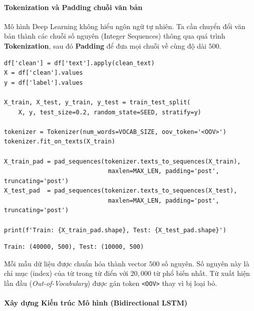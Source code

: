 \paragraph{Tokenization và Padding chuỗi văn bản} \hfill\mbox{}

Mô hình Deep Learning không hiểu ngôn ngữ tự nhiên. Ta cần chuyển đổi văn bản thành các chuỗi số nguyên (Integer Sequences) thông qua quá trình \textbf{Tokenization}, sau đó \textbf{Padding} để đưa mọi chuỗi về cùng độ dài $500$.

\begin{lstlisting}[style=pythoncode, caption={Tokenize và Padding chuẩn hóa độ dài chuỗi}]
df['clean'] = df['text'].apply(clean_text)
X = df['clean'].values
y = df['label'].values

X_train, X_test, y_train, y_test = train_test_split(
    X, y, test_size=0.2, random_state=SEED, stratify=y)

tokenizer = Tokenizer(num_words=VOCAB_SIZE, oov_token='<OOV>')
tokenizer.fit_on_texts(X_train)

X_train_pad = pad_sequences(tokenizer.texts_to_sequences(X_train),
                             maxlen=MAX_LEN, padding='post', truncating='post')
X_test_pad  = pad_sequences(tokenizer.texts_to_sequences(X_test),
                             maxlen=MAX_LEN, padding='post', truncating='post')

print(f'Train: {X_train_pad.shape}, Test: {X_test_pad.shape}')
\end{lstlisting}

\begin{lstlisting}[style=consoleoutput, caption={Output: Kích thước dữ liệu sau Padding}]
Train: (40000, 500), Test: (10000, 500)
\end{lstlisting}

Mỗi mẫu dữ liệu được chuẩn hóa thành vector $500$ số nguyên. Số nguyên này là chỉ mục (index) của từ trong từ điển với $20{,}000$ từ phổ biến nhất. Từ xuất hiện lần đầu (\textit{Out-of-Vocabulary}) được gán token \texttt{<OOV>} thay vì bị loại bỏ.

\paragraph{Xây dựng Kiến trúc Mô hình (Bidirectional LSTM)} \hfill\mbox{}

